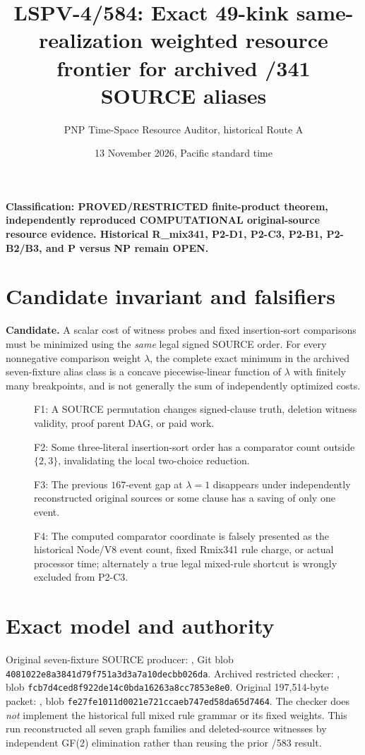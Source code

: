 \documentclass[11pt]{article}
\title{LSPV-4/584: Exact 49-kink same-realization weighted resource frontier for archived /341 SOURCE aliases}
\author{PNP Time-Space Resource Auditor, historical Route A}
\date{13 November 2026, Pacific standard time}
\begin{document}
\maketitle
\noindent\textbf{Classification: PROVED/RESTRICTED finite-product theorem, independently reproduced COMPUTATIONAL original-source resource evidence. Historical R_mix341, P2-D1, P2-C3, P2-B1, P2-B2/B3, and P versus NP remain OPEN.}

\section*{Candidate invariant and falsifiers}
\noindent\textbf{Candidate.} A scalar cost of witness probes and fixed insertion-sort comparisons must be minimized using the \emph{same} legal signed SOURCE order. For every nonnegative comparison weight $\lambda$, the complete exact minimum in the archived seven-fixture alias class is a concave piecewise-linear function of $\lambda$ with finitely many breakpoints, and is not generally the sum of independently optimized costs.

\begin{description}
\item[] F1: A SOURCE permutation changes signed-clause truth, deletion witness validity, proof parent DAG, or paid work.
\item[] F2: Some three-literal insertion-sort order has a comparator count outside $\{2,3\}$, invalidating the local two-choice reduction.
\item[] F3: The previous $167$-event gap at $\lambda=1$ disappears under independently reconstructed original sources or some clause has a saving of only one event.
\item[] F4: The computed comparator coordinate is falsely presented as the historical Node/V8 event count, fixed Rmix341 rule charge, or actual processor time; alternately a true legal mixed-rule shortcut is wrongly excluded from P2-C3.
\end{description}

\section*{Exact model and authority}
Original seven-fixture SOURCE producer: , Git blob \texttt{4081022e8a3841d79f751a3d3a7a10decbb026da}. Archived restricted checker: , blob \texttt{fcb7d4ced8f922de14c0bda16263a8cc7853e8e0}. Original 197,514-byte packet: , blob \texttt{fe27fe1011d0021e721ccaeb747ed58da65d7464}. The checker does \emph{not} implement the historical full mixed rule grammar or its fixed weights. This run reconstructed all seven graph families and deleted-source witnesses by independent GF(2) elimination rather than reusing the prior /583 result.
\end{document}
